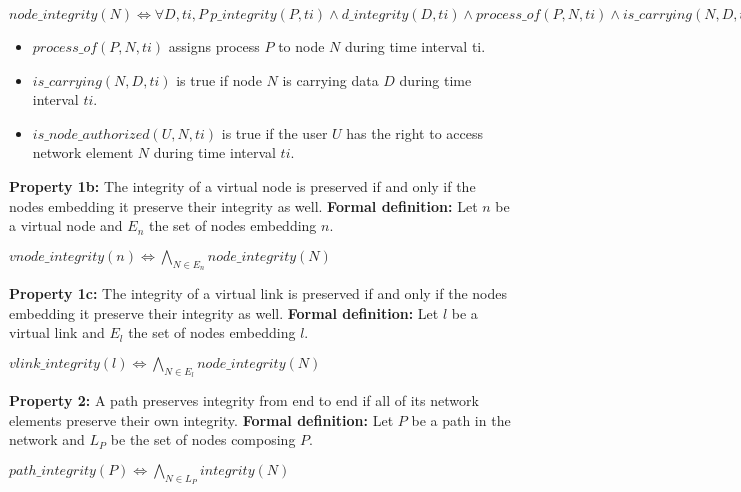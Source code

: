\begin{myformula}
$node\_integrity(N) \Leftrightarrow \forall D,ti,P~p\_integrity(P,ti) \wedge d\_integrity(D,ti) \wedge process\_of(P,N,ti) \wedge is\_carrying(N,D,ti) \Rightarrow is\_node\_authorized(U,N,ti)$
\end{myformula}

\begin{itemize}
\item $process\_of(P,N,ti)$ assigns process $P$ to node $N$ during time interval ti.
\item $is\_carrying(N,D,ti)$ is true if node $N$ is carrying data $D$ during time interval $ti$.
\item $is\_node\_authorized(U,N,ti)$ is true if the user $U$ has the right to access network element $N$ during time interval $ti$.
\end{itemize}

\textbf{Property 1b:} The integrity of a virtual node is preserved if and only if the nodes embedding it preserve their integrity as well.
\newline
\textbf{Formal definition:} Let $n$ be a virtual node and $E_n$ the set of nodes embedding $n$.

\begin{myformula}
$vnode\_integrity(n) \Leftrightarrow \bigwedge\limits_{N \in E_n} node\_integrity(N)$
\end{myformula}

\textbf{Property 1c:} The integrity of a virtual link is preserved if and only if the nodes embedding it preserve their integrity as well.
\newline
\textbf{Formal definition:} Let $l$ be a virtual link and $E_l$ the set of nodes embedding $l$.

\begin{myformula}
$vlink\_integrity(l) \Leftrightarrow \bigwedge\limits_{N \in E_l} node\_integrity(N)$
\end{myformula}


\textbf{Property 2:} A path preserves integrity from end to end if all of its network elements preserve their own integrity.
\newline \textbf{Formal definition:} Let $P$ be a path in the network and $L_P$ be the set of nodes composing $P$.

\begin{myformula}
$path\_integrity(P) \Leftrightarrow \bigwedge\limits_{N \in L_P}integrity(N) $
\end{myformula}

